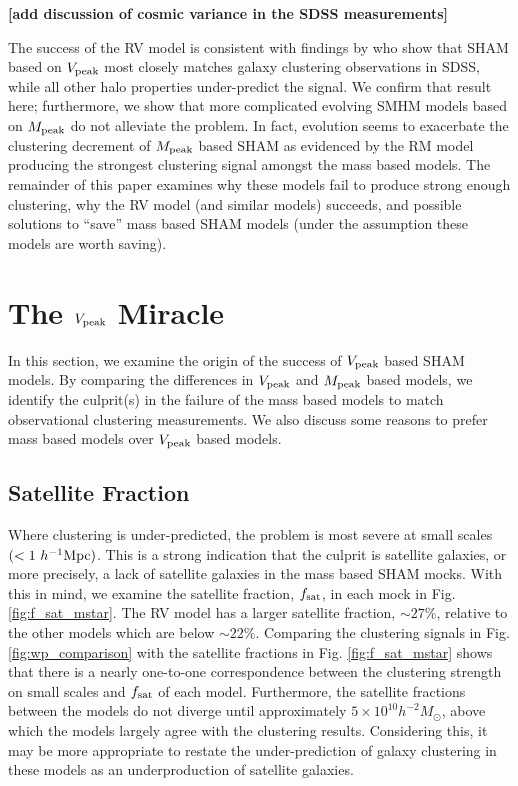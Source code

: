 \documentclass[a4paper,fleqn,usenatbib]{mnras}
\begin{document}
{\bf [add discussion of cosmic variance in the SDSS measurements]}

The success of the RV model is consistent with findings by \cite{Reddick:2013gi} who show that SHAM based on $V_{\rm peak}$ most closely matches galaxy clustering observations in SDSS, while all other halo properties under-predict the signal.  We confirm that result here; furthermore, we show that more complicated evolving SMHM models based on $M_{\rm peak}$ do not alleviate the problem.  In fact, evolution seems to exacerbate the clustering decrement of $M_{\rm peak}$ based SHAM as evidenced by the RM model producing the strongest clustering signal amongst the mass based models.  The remainder of this paper examines why these models fail to produce strong enough clustering, why the RV model (and similar models) succeeds, and possible solutions to ``save'' mass based SHAM models (under the assumption these models are worth saving).  


\section{The $V_{\rm peak}$ Miracle}

In this section, we examine the origin of the success of $V_{\rm peak}$ based SHAM models.  By comparing the differences in $V_{\rm peak}$ and $M_{\rm peak}$ based models, we identify the culprit(s) in the failure of the mass based models to match observational clustering measurements.  We also discuss some reasons to prefer mass based models over $V_{\rm peak}$ based models.

\subsection{Satellite Fraction}

Where clustering is under-predicted, the problem is most severe at small scales $(<1~h^{-1}{\rm Mpc})$.  This is a strong indication that the culprit is satellite galaxies, or more precisely, a lack of satellite galaxies in the mass based SHAM mocks.  With this in mind, we examine the satellite fraction, $f_{\rm sat}$, in each mock in Fig. \ref{fig:f_sat_mstar}.  The RV model has a larger satellite fraction, $\sim 27\%$, relative to the other models which are below $\sim 22\%$.  Comparing the clustering signals in Fig. \ref{fig:wp_comparison} with the satellite fractions in Fig. \ref{fig:f_sat_mstar} shows that there is a nearly one-to-one correspondence between the clustering strength on small scales and $f_{\rm sat}$ of each model.  Furthermore, the satellite fractions between the models do not diverge until approximately $5 \times 10^{10}h^{-2}M_{\odot}$, above which the models largely agree with the clustering results.  Considering this, it may be more appropriate to restate the under-prediction of galaxy clustering in these models as an underproduction of satellite galaxies.
\end{document}
